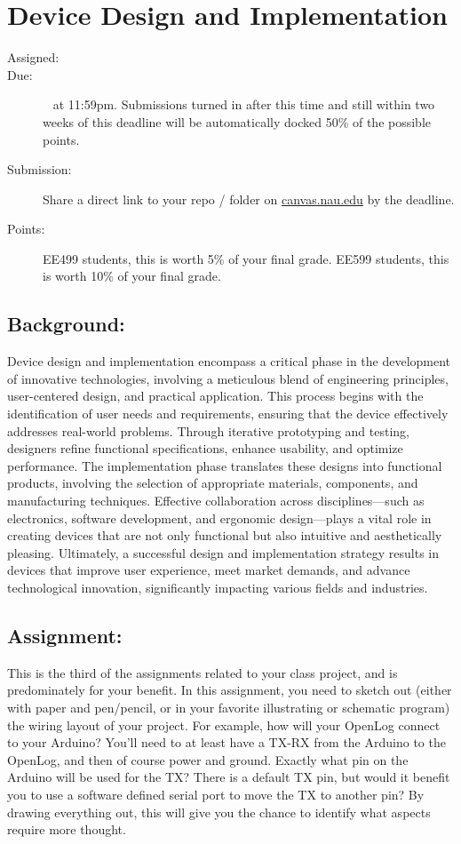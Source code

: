 \documentclass[11pt]{article}
\begin{document}
\section{Device Design and Implementation}
\begin{description}
	\item [Assigned:] \wkEightTu
	\item [Due:] \wkTenTu~ at 11:59pm. Submissions turned in after this time and still within two weeks of this deadline will be automatically docked 50\% of the possible points.
	\item [Submission:] Share a direct link to your repo / folder on \href{https://canvas.nau.edu}{canvas.nau.edu} by the deadline.
	\item [Points:] EE499 students, this is worth 5\% of your final grade.  EE599 students, this is worth 10\% of your final grade.
\end{description}

\subsection*{Background:}
Device design and implementation encompass a critical phase in the development of innovative technologies, involving a meticulous blend of engineering principles, user-centered design, and practical application. This process begins with the identification of user needs and requirements, ensuring that the device effectively addresses real-world problems. Through iterative prototyping and testing, designers refine functional specifications, enhance usability, and optimize performance. The implementation phase translates these designs into functional products, involving the selection of appropriate materials, components, and manufacturing techniques. Effective collaboration across disciplines—such as electronics, software development, and ergonomic design—plays a vital role in creating devices that are not only functional but also intuitive and aesthetically pleasing. Ultimately, a successful design and implementation strategy results in devices that improve user experience, meet market demands, and advance technological innovation, significantly impacting various fields and industries.

\subsection*{Assignment:}
This is the third of the assignments related to your class project, and is predominately for your benefit. In this assignment, you need to sketch out (either with paper and pen/pencil, or in your favorite illustrating or schematic program) the wiring layout of your project. For example, how will your OpenLog connect to your Arduino? You'll need to at least have a TX-RX from the Arduino to the OpenLog, and then of course power and ground. Exactly what pin on the Arduino will be used for the TX? There is a default TX pin, but would it benefit you to use a software defined serial port to move the TX to another pin? By drawing everything out, this will give you the chance to identify what aspects require more thought.
\end{document}
